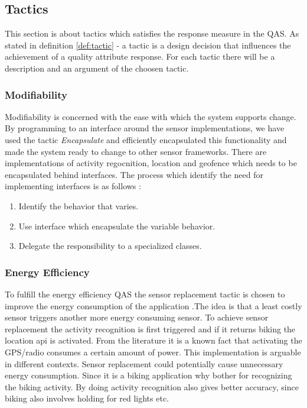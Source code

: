 \subsection{Tactics}
This section is about tactics which satisfies the response measure in the QAS. As stated in definition \ref{def:tactic} - a tactic is a design decision that influences the achievement of a quality attribute response. For each tactic there will be a description and an argument of the choosen tactic. 

\subsubsection{Modifiability}
\label{subsec:modifiability}
 Modifiability is concerned with the ease with which the system supports change. By programming to an interface around the sensor implementations, we have used the tactic \textit{Encapsulate} \cite{Bass} and efficiently encapsulated this functionality and made the system ready to change to other sensor frameworks. There are implementations of activity regocnition, location and geofence which needs to be encapsulated behind interfaces. The process which identify the need for implementing interfaces is as follows \cite{Baerbak10}: 

\begin{enumerate}
    \item Identify the behavior that varies. 

    \item Use interface which encapsulate the variable behavior.     
    
    \item Delegate the responsibility to a specialized classes.
\end{enumerate}
 
 
 
\subsubsection{Energy Efficiency}
\label{subsec:energy_efficiency}
To fulfill the energy efficiency QAS the sensor replacement tactic \cite{Kjaergaard:2015:AQT:2737182.2737196} is chosen to improve the energy consumption of the application .The idea is that a least costly sensor triggers another more energy consuming sensor. To achieve sensor replacement the activity recognition is first triggered and if it returns biking the location api is activated. From the literature \cite{Kjaergaard2010} it is a known fact that activating the GPS/radio consumes a certain amount of power. This implementation is arguable in different contexts. Sensor replacement could potentially cause unnecessary energy consumption. Since it is a biking application why bother for recognizing the biking activity. By doing activity recognition also gives better accuracy, since biking also involves holding for red lights etc. 

